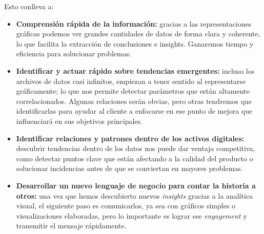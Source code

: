 \documentclass[preprint,12pt]{elsarticle}
\begin{document}
	Esto conlleva a:
	\begin{itemize}
		\item \textbf{Comprensión rápida de la información:} gracias a las representaciones gráficas podemos ver grandes cantidades de datos de forma clara y coherente, lo que facilita la extracción de conclusiones e insights. Ganaremos tiempo y eficiencia para solucionar problemas.
		\item \textbf{Identificar y actuar rápido sobre tendencias emergentes:} incluso los archivos de datos casi infinitos, empiezan a tener sentido al representarse gráficamente; lo que nos permite detectar parámetros que están altamente correlacionados. Algunas relaciones serán obvias, pero otras tendremos que identificarlas para ayudar al cliente a enfocarse en ese punto de mejora que influenciará en sus objetivos principales.
		\item \textbf{Identificar relaciones y patrones dentro de los activos digitales:} descubrir tendencias dentro de los datos nos puede dar ventaja competitiva, como detectar puntos clave que están afectando a la calidad del producto o solucionar incidencias antes de que se conviertan en mayores problemas.
		\item \textbf{Desarrollar un nuevo lenguaje de negocio para contar la historia a otros:} una vez que hemos descubierto nuevos \textit{insights} gracias a la analítica visual, el siguiente paso es comunicarlos, ya sea con gráficos simples o visualizaciones elaboradas, pero lo importante es lograr ese \textit{engagement} y transmitir el mensaje rápidamente.
	\end{itemize}
	
\end{document}
